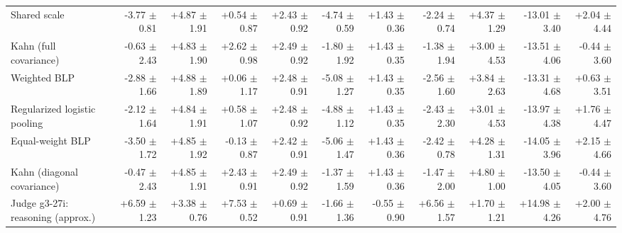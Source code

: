 \begin{tabular}{lrrrrrrrrrr}
Shared scale & -3.77 {\scriptsize $\pm$ 0.81} & +4.87 {\scriptsize $\pm$ 1.91} & +0.54 {\scriptsize $\pm$ 0.87} & +2.43 {\scriptsize $\pm$ 0.92} & -4.74 {\scriptsize $\pm$ 0.59} & +1.43 {\scriptsize $\pm$ 0.36} & -2.24 {\scriptsize $\pm$ 0.74} & +4.37 {\scriptsize $\pm$ 1.29} & -13.01 {\scriptsize $\pm$ 3.40} & +2.04 {\scriptsize $\pm$ 4.44} \\
Kahn (full covariance) & -0.63 {\scriptsize $\pm$ 2.43} & +4.83 {\scriptsize $\pm$ 1.90} & +2.62 {\scriptsize $\pm$ 0.98} & +2.49 {\scriptsize $\pm$ 0.92} & -1.80 {\scriptsize $\pm$ 1.92} & +1.43 {\scriptsize $\pm$ 0.35} & -1.38 {\scriptsize $\pm$ 1.94} & +3.00 {\scriptsize $\pm$ 4.53} & -13.51 {\scriptsize $\pm$ 4.06} & -0.44 {\scriptsize $\pm$ 3.60} \\
Weighted BLP & -2.88 {\scriptsize $\pm$ 1.66} & +4.88 {\scriptsize $\pm$ 1.89} & +0.06 {\scriptsize $\pm$ 1.17} & +2.48 {\scriptsize $\pm$ 0.91} & -5.08 {\scriptsize $\pm$ 1.27} & +1.43 {\scriptsize $\pm$ 0.35} & -2.56 {\scriptsize $\pm$ 1.60} & +3.84 {\scriptsize $\pm$ 2.63} & -13.31 {\scriptsize $\pm$ 4.68} & +0.63 {\scriptsize $\pm$ 3.51} \\
Regularized logistic pooling & -2.12 {\scriptsize $\pm$ 1.64} & +4.84 {\scriptsize $\pm$ 1.91} & +0.58 {\scriptsize $\pm$ 1.07} & +2.48 {\scriptsize $\pm$ 0.92} & -4.88 {\scriptsize $\pm$ 1.12} & +1.43 {\scriptsize $\pm$ 0.35} & -2.43 {\scriptsize $\pm$ 2.30} & +3.01 {\scriptsize $\pm$ 4.53} & -13.97 {\scriptsize $\pm$ 4.38} & +1.76 {\scriptsize $\pm$ 4.47} \\
Equal-weight BLP & -3.50 {\scriptsize $\pm$ 1.72} & +4.85 {\scriptsize $\pm$ 1.92} & -0.13 {\scriptsize $\pm$ 0.87} & +2.42 {\scriptsize $\pm$ 0.91} & -5.06 {\scriptsize $\pm$ 1.47} & +1.43 {\scriptsize $\pm$ 0.36} & -2.42 {\scriptsize $\pm$ 0.78} & +4.28 {\scriptsize $\pm$ 1.31} & -14.05 {\scriptsize $\pm$ 3.96} & +2.15 {\scriptsize $\pm$ 4.66} \\
Kahn (diagonal covariance) & -0.47 {\scriptsize $\pm$ 2.43} & +4.85 {\scriptsize $\pm$ 1.91} & +2.43 {\scriptsize $\pm$ 0.91} & +2.49 {\scriptsize $\pm$ 0.92} & -1.37 {\scriptsize $\pm$ 1.59} & +1.43 {\scriptsize $\pm$ 0.36} & -1.47 {\scriptsize $\pm$ 2.00} & +4.80 {\scriptsize $\pm$ 1.00} & -13.50 {\scriptsize $\pm$ 4.05} & -0.44 {\scriptsize $\pm$ 3.60} \\
Judge g3-27i: reasoning (approx.) & +6.59 {\scriptsize $\pm$ 1.23} & +3.38 {\scriptsize $\pm$ 0.76} & +7.53 {\scriptsize $\pm$ 0.52} & +0.69 {\scriptsize $\pm$ 0.91} & -1.66 {\scriptsize $\pm$ 1.36} & -0.55 {\scriptsize $\pm$ 0.90} & +6.56 {\scriptsize $\pm$ 1.57} & +1.70 {\scriptsize $\pm$ 1.21} & +14.98 {\scriptsize $\pm$ 4.26} & +2.00 {\scriptsize $\pm$ 4.76} \\

\end{tabular}
